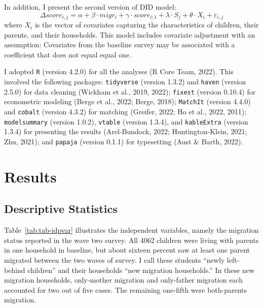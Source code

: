 \documentclass[
  man,floatsintext]{apa7}
\begin{document}
In addition, I present the second version of DID model: \[\Delta score_{i,j} = \alpha + \beta \cdot migr_{i} + \gamma \cdot score_{i;1} + \lambda \cdot S_{j} + \theta \cdot X_{i} + \varepsilon_{i,j}\] where \(X_{i}\) is the vector of covariates capturing the characteristics of children, their parents, and their households. This model includes covariate adjustment with an assumption: Covariates from the baseline survey may be associated with a coefficient that does not equal equal one.

I adopted \texttt{R} (version 4.2.0) for all the analyses (R Core Team, 2022). This involved the following packages: \texttt{tidyverse} (version 1.3.2) and \texttt{haven} (version 2.5.0) for data cleaning (Wickham et al., 2019, 2022); \texttt{fixest} (version 0.10.4) for econometric modeling (Berge et al., 2022; Berge, 2018); \texttt{MatchIt} (version 4.4.0) and \texttt{cobalt} (version 4.3.2) for matching (Greifer, 2022; Ho et al., 2022, 2011); \texttt{modelsummary} (version 1.0.2), \texttt{vtable} (version 1.3.4), and \texttt{kableExtra} (version 1.3.4) for presenting the results (Arel-Bundock, 2022; Huntington-Klein, 2021; Zhu, 2021); and \texttt{papaja} (version 0.1.1) for typesetting (Aust \& Barth, 2022).

\newpage

\hypertarget{results}{%
\section{Results}\label{results}}

\hypertarget{descriptive-statistics}{%
\subsection{Descriptive Statistics}\label{descriptive-statistics}}

Table~\ref{tab:tab-idpvar} illustrates the independent variables, namely the migration status reported in the wave two survey. All 4062 children were living with parents in one household in baseline, but about sixteen percent saw at least one parent migrated between the two waves of survey. I call these students ``newly left-behind children'' and their households ``new migration households.'' In these new migration households, only-mother migration and only-father migration each accounted for two out of five cases. The remaining one-fifth were both-parents migration.

\renewcommand{\arraystretch}{0.72}
\end{document}
